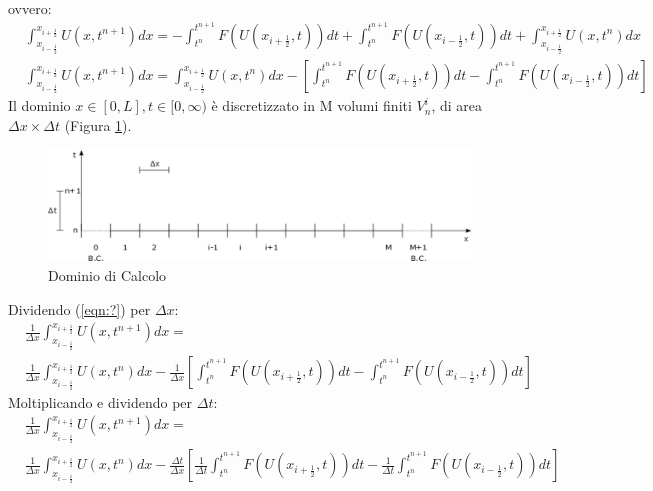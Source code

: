 \documentclass[12pt]{article} %
\begin{document}
\noindent ovvero:
\begin{equation}
    \begin{split}
    &\int_{x_{i-\frac{1}{2}}}^{x_{i+\frac{1}{2}}}U\left(x,t^{n+1}\right)dx=-\int_{t^n}^{t^{n+1}}F\left(U\left(x_{i+\frac{1}{2}},t\right)\right)dt+\int_{t^n}^{t^{n+1}}F\left(U\left(x_{i-\frac{1}{2}},t\right)\right)dt+\int_{x_{i-\frac{1}{2}}}^{x_{i+\frac{1}{2}}}U\left(x,t^n\right)dx \\
    &\int_{x_{i-\frac{1}{2}}}^{x_{i+\frac{1}{2}}}U\left(x,t^{n+1}\right)dx=\int_{x_{i-\frac{1}{2}}}^{x_{i+\frac{1}{2}}}U\left(x,t^n\right)dx-\left[\int_{t^n}^{t^{n+1}}F\left(U\left(x_{i+\frac{1}{2}},t\right)\right)dt-\int_{t^n}^{t^{n+1}}F\left(U\left(x_{i-\frac{1}{2}},t\right)\right)dt\right]
    \end{split}
    \label{eqn:?}
\end{equation}
\noindent Il dominio $x \in [0, L], t \in [0, \infty)$ è discretizzato in M volumi finiti $V^{i}_n$, di area $\Delta x \times \Delta t$ (Figura \ref{fig:Dominio di Calcolo}).
\begin{figure}
    \centering
    \includegraphics[width=\textwidth]{Dominio di Calcolo.png}
    \caption{Dominio di Calcolo}
    \label{fig:Dominio di Calcolo}
\end{figure}
\noindent Dividendo (\ref{eqn:?}) per $\Delta x$:
\begin{equation}
    \begin{split}
    &\frac{1}{\Delta x}\int_{x_{i-\frac{1}{2}}}^{x_{i+\frac{1}{2}}}U\left(x,t^{n+1}\right)dx= \\ &\frac{1}{\Delta x}\int_{x_{i-\frac{1}{2}}}^{x_{i+\frac{1}{2}}}U\left(x,t^n\right)dx-\frac{1}{\Delta x}\left[\int_{t^n}^{t^{n+1}}F\left(U\left(x_{i+\frac{1}{2}},t\right)\right)dt-\int_{t^n}^{t^{n+1}}F\left(U\left(x_{i-\frac{1}{2}},t\right)\right)dt\right]
    \end{split}
    \label{eqn:?_1/Deltax}
\end{equation}
\noindent Moltiplicando e dividendo per $\Delta t$:
\begin{equation}
    \begin{split}
    &\frac{1}{\Delta x}\int_{x_{i-\frac{1}{2}}}^{x_{i+\frac{1}{2}}}U\left(x,t^{n+1}\right)dx= \\ &\frac{1}{\Delta x}\int_{x_{i-\frac{1}{2}}}^{x_{i+\frac{1}{2}}}U\left(x,t^n\right)dx-\frac{\Delta t}{\Delta x}\left[\frac{1}{\Delta t}\int_{t^n}^{t^{n+1}}F\left(U\left(x_{i+\frac{1}{2}},t\right)\right)dt-\frac{1}{\Delta t}\int_{t^n}^{t^{n+1}}F\left(U\left(x_{i-\frac{1}{2}},t\right)\right)dt\right]
    \end{split}
    \label{eqn:?_Deltat/Deltax}
\end{equation}
\end{document}
